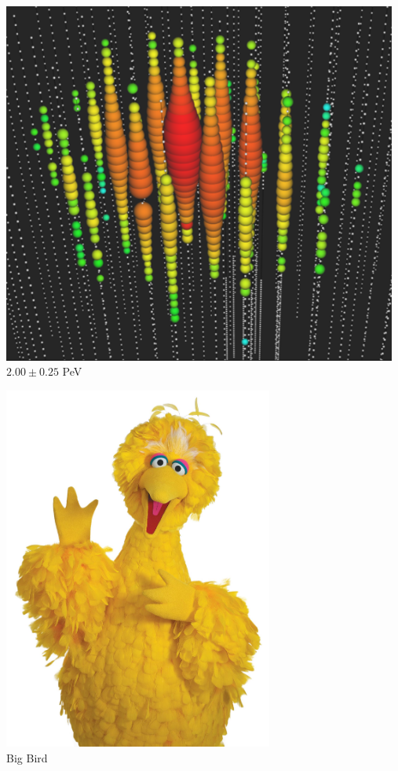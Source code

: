 \Tr
{}%
\begin{center}
\includegraphics[keepaspectratio,width=13cm]{big-bird}\\
$2.00 \pm 0.25$ PeV
\end{center}

\newpage

\begin{center}
\includegraphics[keepaspectratio,height=12cm]{big-bird-photo}\\
Big Bird
\end{center}

